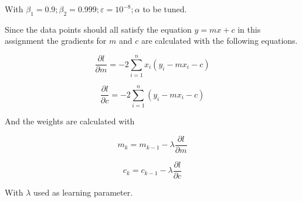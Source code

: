 With $\beta_1 = 0.9; \beta_2 = 0.999; \varepsilon = 10^{-8}; \alpha $ to be tuned.

Since the data points should all satisfy the equation $y = mx + c$ in this assignment the gradients for $m$ and $c$ are calculated with the following equations.

\begin{equation}\label{gradients1}
    \frac{\partial l}{\partial m} = -2 \sum\limits_{i=1}^n x_i (y_i - mx_i - c)
\end{equation}

\begin{equation}\label{gradients2}
    \frac{\partial l}{\partial c} = -2 \sum\limits_{i=1}^n (y_i - mx_i - c)
\end{equation}

And the weights are calculated with

\begin{equation}\label{gradients2}
    m_k = m_{k-1} - \lambda \frac{\partial l}{\partial m}
\end{equation}

\begin{equation}\label{gradients2}
    c_k = c_{k-1} - \lambda \frac{\partial l}{\partial c}
\end{equation}

With $\lambda$ used as learning parameter.



